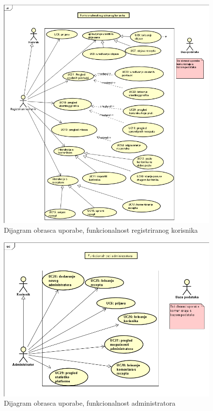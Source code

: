					\begin{figure}[H]
						\includegraphics[scale=1.2]{slike/UC_reg.png} %
						\centering
						\caption{Dijagram obrasca uporabe, funkcionalnost registriranog korisnika}
						\label{fig:UC_diagram2}
					\end{figure}

					\begin{figure}[H]
						\includegraphics[scale=1]{slike/UC_admin.png} %
						\centering
						\caption{Dijagram obrasca uporabe, funkcionalnost administratora}
						\label{fig:UC_diagram3}
					\end{figure}
				\eject		
				
